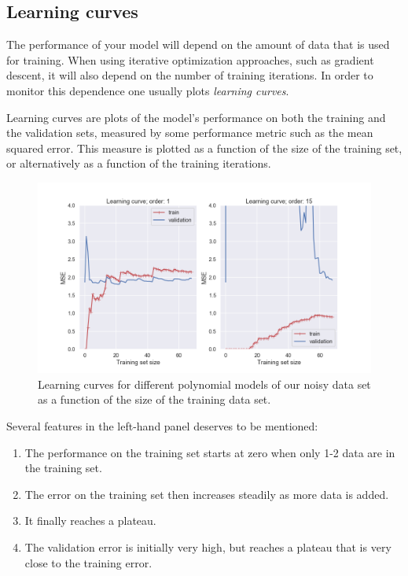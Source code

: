 \documentclass[%
oneside,                 %
final,                   %
10pt]{article}
\begin{document}
\subsection{Learning curves}

The performance of your model will depend on the amount of data that is used for training. When using iterative optimization approaches, such as gradient descent, it will also depend on the number of training iterations. In order to monitor this dependence one usually plots \emph{learning curves}.

Learning curves are plots of the model's performance on both the training and the validation sets, measured by some performance metric such as the mean squared error. This measure is plotted as a function of the size of the training set, or alternatively as a function of the training iterations.


\begin{figure}[!ht]  %
  \centerline{\includegraphics[width=0.8\linewidth]{fig/learning_curve.png}}
  \caption{
  Learning curves for different polynomial models of our noisy data set as a function of the size of the training data set. \label{fig-learning_curve}
  }
\end{figure}


Several features in the left-hand panel deserves to be mentioned:

\begin{enumerate}
\item The performance on the training set starts at zero when only 1-2 data are in the training set.

\item The error on the training set then increases steadily as more data is added. 

\item It finally reaches a plateau.

\item The validation error is initially very high, but reaches a plateau that is very close to the training error.
\end{enumerate}
\end{document}

